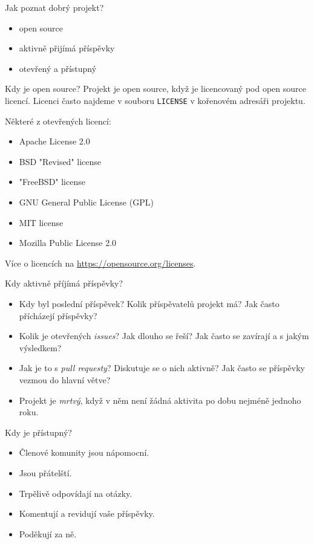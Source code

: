 \documentclass[11pt]{beamer}
\begin{document}
\begin{frame}{Jak poznat dobrý projekt?}
	\begin{itemize}
		\item open source
		\item aktivně přijímá příspěvky
		\item otevřený a přístupný
	\end{itemize}
\end{frame}

\begin{frame}{Kdy je open source?}
	Projekt je open source, když je licencovaný pod open source licencí. Licenci často najdeme v souboru \texttt{LICENSE} v kořenovém adresáři projektu.
	
	Některé z otevřených licencí:
	
	\begin{itemize}
		\item  Apache License 2.0
		\item  BSD "Revised" license
		\item  "FreeBSD" license
		\item  GNU General Public License (GPL)
		\item  MIT license
		\item Mozilla Public License 2.0
	\end{itemize}

Více o licencích na \url{https://opensource.org/licenses}.
\end{frame}

\begin{frame}{Kdy aktivně příjímá příspěvky?}
	\begin{itemize}
		\item Kdy byl poslední příspěvek? Kolik příspěvatelů projekt má? Jak často přícházejí příspěvky?
		\item Kolik je otevřených \textit{issues}? Jak dlouho se řeší? Jak často se zavírají a s jakým výsledkem?
		\item Jak je to s \textit{pull requesty}? Diskutuje se o nich aktivně? Jak často se příspěvky vezmou do hlavní větve?
		\item Projekt je \textit{mrtvý}, když v něm není žádná aktivita po dobu nejméně jednoho roku.
	\end{itemize}
\end{frame}

\begin{frame}{Kdy je přístupný?}
	\begin{itemize}
		\item Členové komunity jsou nápomocní.
		\item Jsou přátelští.
		\item Trpělivě odpovídají na otázky.
		\item Komentují a revidují vaše příspěvky.
		\item Poděkují za ně.
	\end{itemize}
\end{frame}
\end{document}
